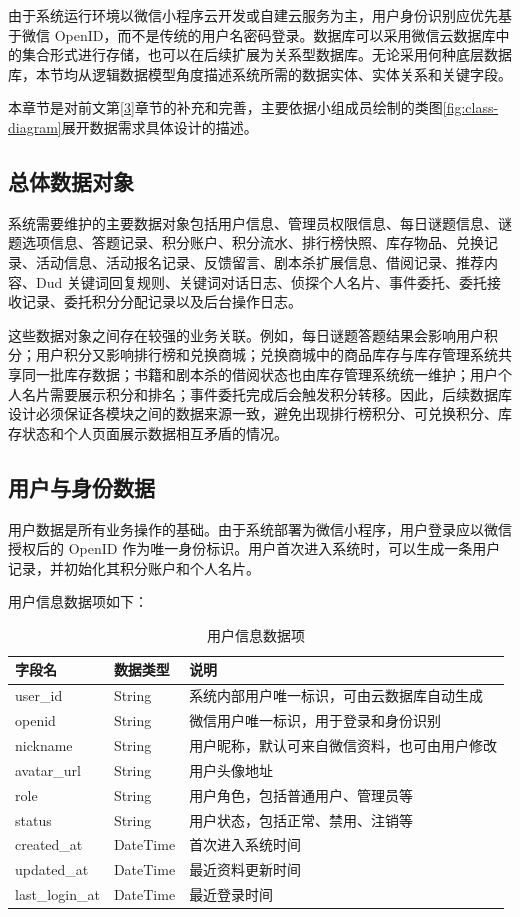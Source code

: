 \documentclass[a4paper,12pt]{article}
\begin{document}
由于系统运行环境以微信小程序云开发或自建云服务为主，用户身份识别应优先基于微信 OpenID，而不是传统的用户名密码登录。数据库可以采用微信云数据库中的集合形式进行存储，也可以在后续扩展为关系型数据库。无论采用何种底层数据库，本节均从逻辑数据模型角度描述系统所需的数据实体、实体关系和关键字段。

本章节是对前文第\ref{3}章节的补充和完善，主要依据小组成员绘制的类图\ref{fig:class-diagram}展开数据需求具体设计的描述。
\subsection{总体数据对象}

系统需要维护的主要数据对象包括用户信息、管理员权限信息、每日谜题信息、谜题选项信息、答题记录、积分账户、积分流水、排行榜快照、库存物品、兑换记录、活动信息、活动报名记录、反馈留言、剧本杀扩展信息、借阅记录、推荐内容、Dud 关键词回复规则、关键词对话日志、侦探个人名片、事件委托、委托接收记录、委托积分分配记录以及后台操作日志。

这些数据对象之间存在较强的业务关联。例如，每日谜题答题结果会影响用户积分；用户积分又影响排行榜和兑换商城；兑换商城中的商品库存与库存管理系统共享同一批库存数据；书籍和剧本杀的借阅状态也由库存管理系统统一维护；用户个人名片需要展示积分和排名；事件委托完成后会触发积分转移。因此，后续数据库设计必须保证各模块之间的数据来源一致，避免出现排行榜积分、可兑换积分、库存状态和个人页面展示数据相互矛盾的情况。

\subsection{用户与身份数据}

用户数据是所有业务操作的基础。由于系统部署为微信小程序，用户登录应以微信授权后的 OpenID 作为唯一身份标识。用户首次进入系统时，可以生成一条用户记录，并初始化其积分账户和个人名片。

用户信息数据项如下：

\begin{longtable}{p{3.5cm}p{3cm}p{7cm}}
\caption{用户信息数据项} \\
\toprule
字段名 & 数据类型 & 说明 \\
\midrule
user\_id & String & 系统内部用户唯一标识，可由云数据库自动生成 \\
openid & String & 微信用户唯一标识，用于登录和身份识别 \\
nickname & String & 用户昵称，默认可来自微信资料，也可由用户修改 \\
avatar\_url & String & 用户头像地址 \\
role & String & 用户角色，包括普通用户、管理员等 \\
status & String & 用户状态，包括正常、禁用、注销等 \\
created\_at & DateTime & 首次进入系统时间 \\
updated\_at & DateTime & 最近资料更新时间 \\
last\_login\_at & DateTime & 最近登录时间 \\
\bottomrule
\end{longtable}
\end{document}
